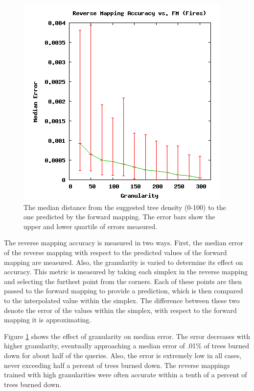 \begin{figure}[ht]
\centering
\includegraphics[scale=.5]{images/results_fires/rmaccfm.png}
\caption{The median distance from the suggested tree density (0-100) to the one predicted by the forward mapping.
The error bars show the upper and lower quartile of errors measured.}
\label{fig:rmaccfm}
\end{figure}

The reverse mapping accuracy is measured in two ways.
First, the median error of the reverse mapping with respect to the predicted values of the forward mapping are measured.
Also, the granularity is varied to determine its effect on accuracy.
This metric is measured by taking each simplex in the reverse mapping and selecting the furthest point from the corners.
Each of these points are then passed to the forward mapping to provide a prediction, which is then compared to the interpolated value within the simplex.
The difference between these two denote the error of the values within the simplex, with respect to the forward mapping it is approximating. 

Figure \ref{fig:rmaccfm} shows the effect of granularity on median error.
The error decreases with higher granularity, eventually approaching a median error of .01\% of trees burned down for about half of the queries.
Also, the error is extremely low in all cases, never exceeding half a percent of trees burned down.
The reverse mappings trained with high granularities were often accurate within a tenth of a percent of trees burned down.

